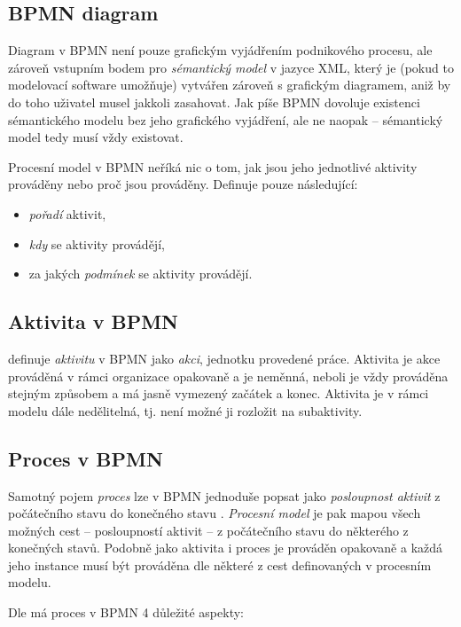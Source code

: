 \subsection{BPMN diagram}
Diagram v BPMN není pouze grafickým vyjádřením podnikového procesu, ale zároveň vstupním bodem pro \textit{sémantický model} v jazyce XML, který je (pokud to modelovací software umožňuje) vytvářen zároveň s grafickým diagramem, aniž by do toho uživatel musel jakkoli zasahovat. Jak píše \cite{Silver2011} BPMN dovoluje existenci sémantického modelu bez jeho grafického vyjádření, ale ne naopak – sémantický model tedy musí vždy existovat.

Procesní model v BPMN neříká nic o tom, jak jsou jeho jednotlivé aktivity prováděny nebo proč jsou prováděny. Definuje pouze následující:

\begin{itemize}
\item \textit{pořadí} aktivit,
\item \textit{kdy} se aktivity provádějí,
\item za jakých \textit{podmínek} se aktivity provádějí.
\end{itemize}

\subsection{Aktivita v BPMN}
\cite{Silver2011} definuje \textit{aktivitu} v BPMN jako \textit{akci}, jednotku provedené práce. Aktivita je akce prováděná v rámci organizace opakovaně a je neměnná, neboli je vždy prováděna stejným způsobem a má jasně vymezený začátek a konec. Aktivita je v rámci modelu dále nedělitelná, tj. není možné ji rozložit na subaktivity.

\subsection{Proces v BPMN}
Samotný pojem \textit{proces} lze v BPMN jednoduše popsat jako \textit{posloupnost aktivit} z počátečního stavu do konečného stavu \cite{Silver2011}. \textit{Procesní model} je pak mapou všech možných cest – posloupností aktivit – z počátečního stavu do některého z konečných stavů. Podobně jako aktivita i proces je prováděn opakovaně a každá jeho instance musí být prováděna dle některé z cest definovaných v procesním modelu.

Dle \cite{Silver2013} má proces v BPMN 4 důležité aspekty:

